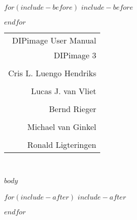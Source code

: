 \documentclass[11pt,twoside]{report}
\begin{document}
$for(include-before)$
$include-before$

$endfor$

\pagestyle{empty}
\hfill
\begin{tabular}{r}
  {\sffamily\Huge DIPimage User Manual} \\
  {\sffamily\Large DIPimage 3} \\
  \vspace{1cm} \\
  {\sffamily\LARGE Cris L. Luengo Hendriks} \\
  \vspace{-6pt} \\
  {\sffamily\LARGE Lucas J. van Vliet} \\
  \vspace{-6pt} \\
  {\sffamily\LARGE Bernd Rieger} \\
  \vspace{-6pt} \\
  {\sffamily\LARGE Michael van Ginkel} \\
  \vspace{-6pt} \\
  {\sffamily\LARGE Ronald Ligteringen} \\
\end{tabular} \\
\vfill\pagebreak\cleardoublepage

\pagestyle{fancy}
\setcounter{tocdepth}{1}
\tableofcontents
\clearemptydoublepage

$body$

$for(include-after)$
$include-after$

$endfor$
\end{document}

